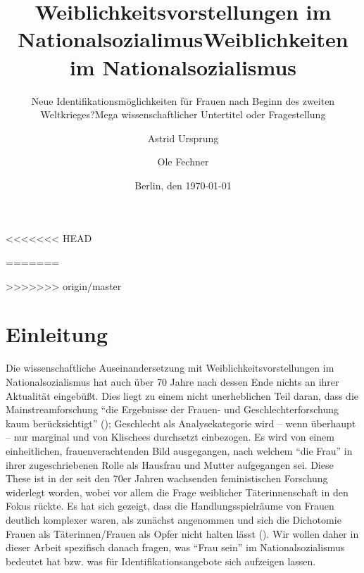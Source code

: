 \documentclass[12pt, titlepage=true, toc=bib]{scrartcl}
\begin{document}
\titlehead{Freie Universität Berlin\\
			FB Politik- und Sozialwissenschaften\\
			Otto-Suhr-Institut\\
			Sommersemester 2016\\
			{[}GEND{]} Rechtsextremismus und Gender: Geschichte und Gegenwart (15095)\\
			Carmen Altmeyer, Till Herold}
\author{Astrid Ursprung\and Ole Fechner}
<<<<<<< HEAD
\title{Weiblichkeitsvorstellungen im Nationalsozialimus}
\subtitle{Neue Identifikationsmöglichkeiten für Frauen nach Beginn des zweiten Weltkrieges?}
=======
\title{Weiblichkeiten im Nationalsozialismus}
\subtitle{Mega wissenschaftlicher Untertitel oder Fragestellung}
>>>>>>> origin/master
\date{\normalsize{Berlin, den \today}}

\publishers{\normalsize{Goltzstr. 16\hfill Gerichtstr. 13\\
							 10781 Berlin\hfill 13347 Berlin\\
							 ursprung@posteo.de\hfill ole.fechner@fu-berlin.de\\
							 Matrikelnummer: 4768210\hfill Matrikelnummer: 4757766\\
							 BA Politikwissenschaft\hfill BA Politikwissenschaft}}


\maketitle[0]

\newpage
\thispagestyle{empty}
\tableofcontents

\newpage
\setcounter{page}{1}

\section{Einleitung}

Die wissenschaftliche Auseinandersetzung mit Weiblichkeitsvorstellungen im Nationalsozialismus hat auch über 70 Jahre nach dessen Ende nichts an ihrer Aktualität eingebüßt. Dies liegt zu einem nicht unerheblichen Teil daran, dass die Mainstreamforschung "`die Ergebnisse der Frauen- und Geschlechterforschung kaum berücksichtigt"' (\cite[9]{frietsch_nationalsozialismus_2015}); Geschlecht als Analysekategorie wird -- wenn überhaupt -- nur marginal und von Klischees durchsetzt einbezogen. Es wird von einem einheitlichen, frauenverachtenden Bild ausgegangen, nach welchem "`die Frau"' in ihrer zugeschriebenen Rolle als Hausfrau und Mutter aufgegangen sei. Diese These ist in der seit den 70er Jahren wachsenden feministischen Forschung widerlegt worden, wobei vor allem die Frage weiblicher Täterinnenschaft in den Fokus rückte. Es hat sich gezeigt, dass die Handlungsspielräume von Frauen deutlich komplexer waren, als zunächst angenommen und sich die Dichotomie Frauen als Täterinnen/Frauen als Opfer nicht halten lässt (\cite[10-11]{frietsch_nationalsozialismus_2015}). Wir wollen daher in dieser Arbeit spezifisch danach fragen, was "`Frau sein"' im Nationalsozialismus bedeutet hat bzw. was für Identifikationsangebote sich aufzeigen lassen.
\end{document}
